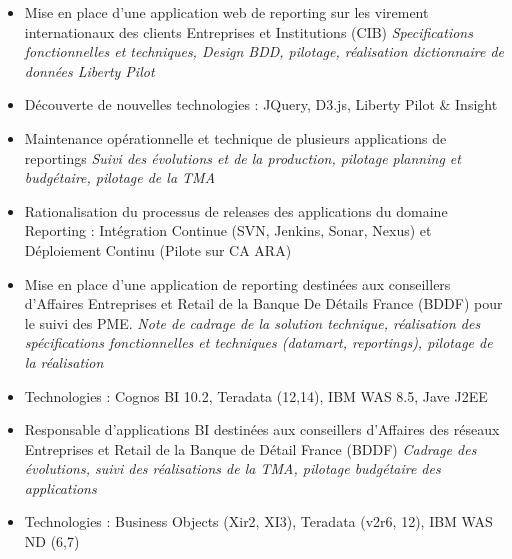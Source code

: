 \documentclass[10pt,a4paper]{moderncv}
\begin{document}
{
\begin{itemize}
 \item Mise en place d'une application web de reporting sur les virement internationaux des clients Entreprises et Institutions (CIB) \newline
	\textit{Specifications fonctionnelles et techniques, Design BDD, pilotage, réalisation dictionnaire de données Liberty Pilot}
 \item Découverte de nouvelles technologies : JQuery, D3.js, Liberty Pilot \& Insight 
\end{itemize}
}



{
\begin{itemize}
 \item Maintenance opérationnelle et technique de plusieurs applications de reportings \newline
 	\textit{Suivi des évolutions et de la production, pilotage planning et budgétaire, pilotage de la TMA}
 \item Rationalisation du processus de releases des applications du domaine Reporting : Intégration Continue (SVN, Jenkins, Sonar, Nexus) et Déploiement Continu (Pilote sur CA ARA)  
\end{itemize}
}


{
\begin{itemize}
 \item Mise en place d'une application de reporting destinées aux conseillers d'Affaires Entreprises et Retail de la Banque De Détails France (BDDF) pour le suivi des PME. \newline
   \textit{Note de cadrage de la solution technique, réalisation des spécifications fonctionnelles et techniques (datamart, reportings), pilotage de la réalisation}
 \item Technologies : Cognos BI 10.2, Teradata (12,14), IBM WAS 8.5, Jave J2EE
\end{itemize}
}

{
\begin{itemize}
 \item Responsable d'applications BI destinées aux conseillers d'Affaires des réseaux Entreprises et Retail de la Banque de Détail France (BDDF) \newline
	\textit{Cadrage des évolutions, suivi des réalisations de la TMA, pilotage budgétaire des applications}
 \item Technologies : Business Objects (Xir2, XI3), Teradata (v2r6, 12), IBM WAS ND (6,7)
\end{itemize}
}
\end{document}
